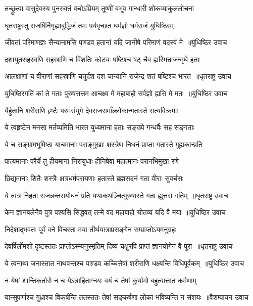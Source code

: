 \twolineshloka
{तच्छ्रुत्वा वासुदेवस्य पुनरुक्तं वचोऽप्रियम्}
{तूष्णीं बभूव गान्धारी शोकव्याकुललोचना}


\twolineshloka
{धृतराष्ट्रस्तु राजर्षिर्निगृह्याबुद्धिजं तमः}
{पर्यपृच्छत धर्मज्ञो धर्मराजं युधिष्ठिरम्}


\threelineshloka
{जीवतां परिमाणज्ञः सैन्यानामसि पाण्डव}
{हतानां यदि जानीषे परिमाणं वदस्वं मे ॥युधिष्ठिर उवाच}
{}


\twolineshloka
{दशायुतसहस्राणि सहस्राणि च विंशतिः}
{कोट्यः षष्टिश्च षट् चैव ह्यस्मिन्राजन्मृधे हताः}


\threelineshloka
{आलक्षाणां च वीराणां सहस्राणि चतुर्दश}
{दश चान्यानि राजेन्द्र शतं षष्टिश्च भारत ॥धृतराष्ट्र उवाच}
{}


\threelineshloka
{युधिष्ठिरगतिं कां ते गताः पुरुषसत्तम}
{आचक्ष्व मे महाबाहो सर्वज्ञो ह्यसि मे मतः ॥युधिष्ठिर उवाच}
{}


\twolineshloka
{यैर्हुतानि शरीराणि हृष्टैः परमसंयुगे}
{देवराजसमाँल्लोकान्गतास्ते सत्यविक्रमाः}


\twolineshloka
{ये त्वहृष्टेन मनसा मर्तव्यमिति भारत}
{युध्यमाना हताः सङ्ख्ये गन्धर्वैः सह सङ्गताः}


\twolineshloka
{ये च सङ्ग्रामभूमिष्ठा याचमानाः पराङ्मुखाः}
{शस्त्रेण निधनं प्राप्ता गतास्ते गुह्यकान्प्रति}


\twolineshloka
{पात्यमानाः परैर्ये तु हीयमाना निरायुधाः}
{हीनिषेवा महात्मानः परानभिमुखा रणे}


\twolineshloka
{छिद्यमानाः शितैः शस्त्रैः क्षत्रधर्मपरायणाः}
{हतास्ते ब्रह्मसदनं गता वीराः सुवर्चसः}


\threelineshloka
{ये त्वत्र निहता राजन्नन्तरायोधनं प्रति}
{यथाकथञ्चित्पुरुषास्ते गता ह्युत्तरां गतिम् ॥धृतराष्ट्र उवाच}
{}


\threelineshloka
{केन ज्ञानबलेनैव पुत्र पश्यसि सिद्धवत्}
{तन्मे वद महाबाहो श्रोतव्यं यदि वै मया ॥युधिष्ठिर उवाच}
{}


\twolineshloka
{निदेशाद्भवतः पूर्वं वने विचरता मया}
{तीर्थयात्राप्रसङ्गेन सम्प्राप्तोऽयमनुग्रहः}


\threelineshloka
{देवर्षिर्लोमशो दृष्टस्ततः प्राप्तोऽस्म्यनुस्मृतिम्}
{दिव्यं चक्षुरपि प्राप्तं ज्ञानयोगेन वै पुरा ॥धृतराष्ट्र उवाच}
{}


\threelineshloka
{ये त्वनाथा जनास्तात नाथवन्तश्च पाण़्डव}
{कच्चित्तेषां शरीराणि धक्ष्यन्ति विधिपूर्वकम् ॥युधिष्ठिर उवाच}
{}


\twolineshloka
{न येषां शान्तिकर्तारो न च येऽत्राहिताग्नयः}
{वयं च तेषां कुर्यामो बहुत्वात्तात कर्मणाम्}


\threelineshloka
{यान्सुपर्णाश्च गुध्राश्च विकर्षन्ति ततस्ततः}
{तेषां सङ्कर्षणा लोका भविष्यन्ति न संशयः ॥वैशम्पायन उवाच}
{}


